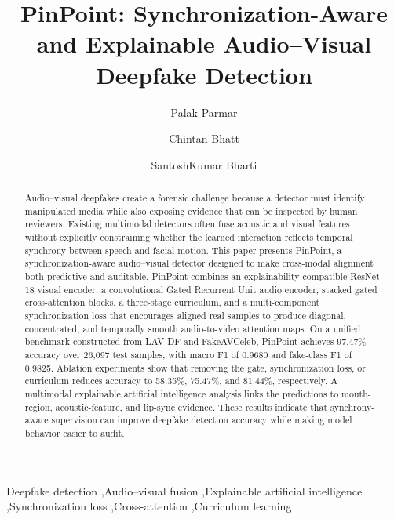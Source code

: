 \documentclass[preprint,12pt,number]{elsarticle}
\begin{document}
\begin{frontmatter}

\title{PinPoint: Synchronization-Aware and Explainable Audio--Visual Deepfake Detection}

\author[inst1]{Palak Parmar}
\author[inst2]{Chintan Bhatt}
\author[inst1]{SantoshKumar Bharti}


\address[inst1]{Department of Computer Science and Engineering, School of Science and Technology, Pandit Deendayal Energy University, Gandhinagar, Gujarat, India}
\address[inst2]{University of Wollongong, Australia}

\begin{abstract}
Audio--visual deepfakes create a forensic challenge because a detector must identify manipulated media while also exposing evidence that can be inspected by human reviewers. Existing multimodal detectors often fuse acoustic and visual features without explicitly constraining whether the learned interaction reflects temporal synchrony between speech and facial motion. This paper presents PinPoint, a synchronization-aware audio--visual detector designed to make cross-modal alignment both predictive and auditable. PinPoint combines an explainability-compatible ResNet-18 visual encoder, a convolutional Gated Recurrent Unit audio encoder, stacked gated cross-attention blocks, a three-stage curriculum, and a multi-component synchronization loss that encourages aligned real samples to produce diagonal, concentrated, and temporally smooth audio-to-video attention maps. On a unified benchmark constructed from LAV-DF and FakeAVCeleb, PinPoint achieves 97.47\% accuracy over 26,097 test samples, with macro F1 of 0.9680 and fake-class F1 of 0.9825. Ablation experiments show that removing the gate, synchronization loss, or curriculum reduces accuracy to 58.35\%, 75.47\%, and 81.44\%, respectively. A multimodal explainable artificial intelligence analysis links the predictions to mouth-region, acoustic-feature, and lip-sync evidence. These results indicate that synchrony-aware supervision can improve deepfake detection accuracy while making model behavior easier to audit.
\end{abstract}

\begin{keyword}
Deepfake detection \sep Audio--visual fusion \sep Explainable artificial intelligence \sep Synchronization loss \sep Cross-attention \sep Curriculum learning
\end{keyword}

\end{frontmatter}
\end{document}
